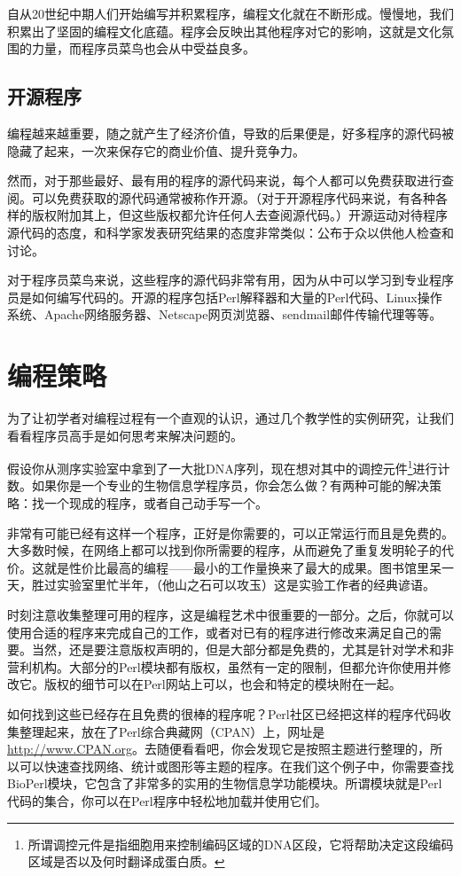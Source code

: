 自从20世纪中期人们开始编写并积累程序，编程文化就在不断形成。慢慢地，我们积累出了坚固的编程文化底蕴。程序会反映出其他程序对它的影响，这就是文化氛围的力量，而程序员菜鸟也会从中受益良多。

\subsection{开源程序}
编程越来越重要，随之就产生了经济价值，导致的后果便是，好多程序的源代码被隐藏了起来，一次来保存它的商业价值、提升竞争力。

然而，对于那些最好、最有用的程序的源代码来说，每个人都可以免费获取进行查阅。可以免费获取的源代码通常被称作开源。（对于开源程序代码来说，有各种各样的版权附加其上，但这些版权都允许任何人去查阅源代码。）开源运动对待程序源代码的态度，和科学家发表研究结果的态度非常类似：公布于众以供他人检查和讨论。

对于程序员菜鸟来说，这些程序的源代码非常有用，因为从中可以学习到专业程序员是如何编写代码的。开源的程序包括Perl解释器和大量的Perl代码、Linux操作系统、Apache网络服务器、Netscape网页浏览器、sendmail邮件传输代理等等。

\section{编程策略}
为了让初学者对编程过程有一个直观的认识，通过几个教学性的实例研究，让我们看看程序员高手是如何思考来解决问题的。

假设你从测序实验室中拿到了一大批DNA序列，现在想对其中的调控元件\footnote{所谓调控元件是指细胞用来控制编码区域的DNA区段，它将帮助决定这段编码区域是否以及何时翻译成蛋白质。}进行计数。如果你是一个专业的生物信息学程序员，你会怎么做？有两种可能的解决策略：找一个现成的程序，或者自己动手写一个。

非常有可能已经有这样一个程序，正好是你需要的，可以正常运行而且是免费的。大多数时候，在网络上都可以找到你所需要的程序，从而避免了重复发明轮子的代价。这就是性价比最高的编程——最小的工作量换来了最大的成果。图书馆里呆一天，胜过实验室里忙半年，（他山之石可以攻玉）这是实验工作者的经典谚语。

时刻注意收集整理可用的程序，这是编程艺术中很重要的一部分。之后，你就可以使用合适的程序来完成自己的工作，或者对已有的程序进行修改来满足自己的需要。当然，还是要注意版权声明的，但是大部分都是免费的，尤其是针对学术和非营利机构。大部分的Perl模块都有版权，虽然有一定的限制，但都允许你使用并修改它。版权的细节可以在Perl网站上可以，也会和特定的模块附在一起。

如何找到这些已经存在且免费的很棒的程序呢？Perl社区已经把这样的程序代码收集整理起来，放在了Perl综合典藏网（CPAN）上，网址是\href{http://www.CPAN.org}{http://www.CPAN.org}。去随便看看吧，你会发现它是按照主题进行整理的，所以可以快速查找网络、统计或图形等主题的程序。在我们这个例子中，你需要查找BioPerl模块，它包含了非常多的实用的生物信息学功能模块。所谓模块就是Perl代码的集合，你可以在Perl程序中轻松地加载并使用它们。

